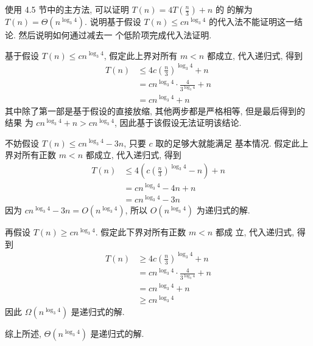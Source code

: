 \documentclass[boxes]{homework}
\begin{document}
\begin{problem}
使用 4.5 节中的主方法, 可以证明 $T(n) = 4T \left( \frac{ n }{ 3 }\right) + n$ 的
的解为 $T(n) = \Theta \left( n^{\log_{3} 4}\right)$. 说明基于假设 $T(n)
    \leqslant c n^{\log_{3} 4}$ 的代入法不能证明这一结论. 然后说明如何通过减去一
个低阶项完成代入法证明.
\end{problem}
\begin{solution}
    基于假设 $T(n) \leqslant c n^{\log_{3} 4}$, 假定此上界对所有 $m < n$ 都成立,
    代入递归式, 得到
    \begin{equation}
        \begin{aligned}
            T(n)
             & \leqslant 4c {\left( \frac{ n }{ 3 }\right)}^{\log_{3} 4} + n \\
             & = cn^{\log_{3} 4} \cdot \frac{ 4 }{ 3^{\log_{3} 4} } + n      \\
             & = cn^{\log_{3} 4} + n
        \end{aligned}
    \end{equation}
    其中除了第一部是基于假设的直接放缩, 其他两步都是严格相等, 但是最后得到的结果
    为 $cn^{\log_{3} 4} + n > cn^{\log_{3} 4}$, 因此基于该假设无法证明该结论.

    不妨假设 $T(n) \leqslant cn^{\log_{3} 4} - 3n$, 只要 $c$ 取的足够大就能满足
    基本情况. 假定此上界对所有正数 $m < n$ 都成立, 代入递归式, 得到
    \begin{equation}
        \begin{aligned}
            T(n)
             & \leqslant 4
            \left( c {\left( \frac{ n }{ 3 }\right)}^{\log_{3} 4} - n\right)
            + n                           \\
             & = cn^{\log_{3} 4} - 4n + n \\
             & = cn^{\log_{3} 4} - 3n
        \end{aligned}
    \end{equation}
    因为 $cn^{\log_{3} 4} - 3n = O \left( n^{\log_{3} 4}\right)$, 所以
    $O \left( n^{\log_{3} 4}\right)$ 为递归式的解.

    再假设 $T(n) \geqslant cn^{\log_{3} 4}$. 假定此下界对所有正数 $m < n$ 都成
    立, 代入递归式, 得到
    \begin{equation}
        \begin{aligned}
            T(n)
             & \geqslant 4c {\left( \frac{ n }{ 3 }\right)}^{\log_{3} 4} + n \\
             & = cn^{\log_{3} 4} \cdot \frac{ 4 }{ 3^{\log_{3} 4} } + n      \\
             & = cn^{\log_{3} 4} + n                                         \\
             & \geqslant cn^{\log_{3} 4}
        \end{aligned}
    \end{equation}
    因此 $\Omega \left( n^{\log_{3} 4}\right)$ 是递归式的解.

    综上所述, $\Theta \left( n^{\log_{3} 4}\right)$ 是递归式的解.
\end{solution}
\end{document}
